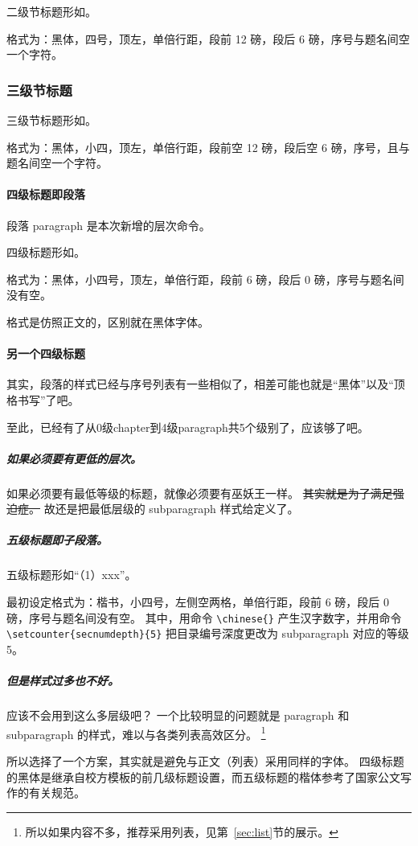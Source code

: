 \documentclass[../Main/thesis]{subfiles}
\begin{document}
二级节标题形如。

格式为：黑体，四号，顶左，单倍行距，段前 12 磅，段后 6 磅，序号与题名间空一个字符。

\subsubsection{三级节标题} \label{sss:subsub3}

三级节标题形如。

格式为：黑体，小四，顶左，单倍行距，段前空 12 磅，段后空 6 磅，序号，且与题名间空一个字符。

\paragraph{四级标题即段落} \label{par:par4}

段落 paragraph 是本次新增的层次命令。

四级标题形如。

格式为：黑体，小四号，顶左，单倍行距，段前 6 磅，段后 0 磅，序号与题名间没有空。

格式是仿照正文的，区别就在黑体字体。

\paragraph{另一个四级标题} \label{spr:subpar}

其实，段落的样式已经与序号列表有一些相似了，相差可能也就是“黑体”以及“顶格书写”了吧。

至此，已经有了从0级chapter到4级paragraph共5个级别了，应该够了吧。

\subparagraph{如果必须要有更低的层次。}
如果必须要有最低等级的标题，就像必须要有巫妖王一样。
\sout{其实就是为了满足强迫症。}
故还是把最低层级的 subparagraph 样式给定义了。

\subparagraph{五级标题即子段落。}
五级标题形如“（1）xxx”。

最初设定格式为：楷书，小四号，左侧空两格，单倍行距，段前 6 磅，段后 0 磅，序号与题名间没有空。
其中，用命令 \verb|\chinese{}| 产生汉字数字，并用命令 \verb|\setcounter{secnumdepth}{5}| 把目录编号深度更改为 subparagraph 对应的等级 5。

\subparagraph{但是样式过多也不好。}
应该不会用到这么多层级吧？
一个比较明显的问题就是 \textsf{paragraph} 和 \textsf{subparagraph} 的样式，难以与各类列表高效区分。
\footnote{所以如果内容不多，推荐采用列表，见第~\ref{sec:list}节的展示。}

所以选择了一个方案，其实就是避免与正文（列表）采用同样的字体。
四级标题的黑体是继承自校方模板的前几级标题设置，而五级标题的楷体参考了国家公文写作的有关规范\cite{GBT9704}。
\end{document}
